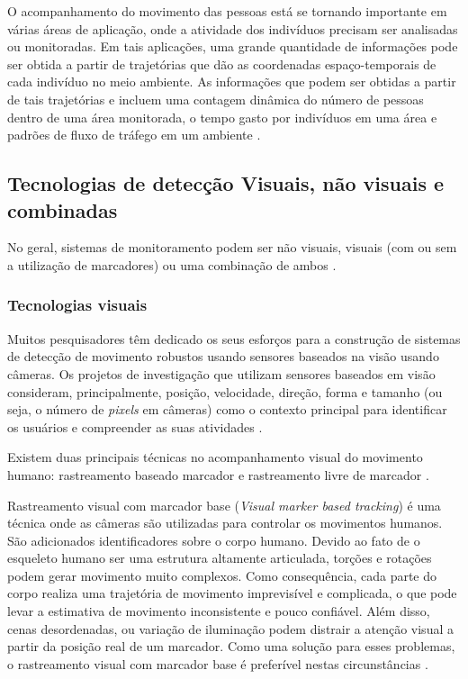 O acompanhamento do movimento das pessoas está se tornando importante em várias áreas de aplicação, onde a atividade dos indivíduos precisam ser analisadas ou monitoradas. Em tais aplicações, uma grande quantidade de informações pode ser obtida a partir de trajetórias que dão as coordenadas espaço-temporais de cada indivíduo no meio ambiente. As informações que podem ser obtidas a partir de tais trajetórias e incluem uma contagem dinâmica do número de pessoas dentro de uma área monitorada, o tempo gasto por indivíduos em uma área e padrões de fluxo de tráfego em um ambiente \cite{segen1996camera}. 

\subsection{Tecnologias de detecção Visuais, não visuais e combinadas}\label{sec:tec-rastreamento}
No geral, sistemas de monitoramento podem ser não visuais, visuais (com ou sem a utilização de marcadores) ou uma combinação de ambos \cite{zhou2008human}.

\subsubsection{Tecnologias visuais}\label{sec:sens-genericos}
Muitos pesquisadores têm dedicado os seus esforços para a construção de sistemas de detecção de movimento robustos usando sensores baseados na visão usando câmeras. Os projetos de investigação que utilizam sensores baseados em visão consideram, principalmente, posição, velocidade, direção, forma e tamanho (ou seja, o número de \textit{pixels} em câmeras) como o contexto principal para identificar os usuários e compreender as suas atividades \cite{stauffer200l}.

Existem duas principais técnicas no acompanhamento visual do movimento humano: rastreamento baseado marcador e rastreamento livre de marcador \cite{YTao2010}.

Rastreamento visual com marcador base (\textit{Visual marker based tracking}) é uma técnica onde as câmeras são utilizadas para controlar os movimentos humanos. São adicionados identificadores sobre o corpo humano. Devido ao fato de o esqueleto humano ser uma estrutura altamente articulada, torções e rotações podem gerar movimento muito complexos. Como consequência, cada parte do corpo realiza uma trajetória de movimento imprevisível e complicada, o que pode levar a estimativa de movimento inconsistente e pouco confiável. Além disso, cenas desordenadas, ou variação de iluminação podem distrair a atenção visual a partir da posição real de um marcador. Como uma solução para esses problemas, o rastreamento visual com marcador base é preferível nestas circunstâncias \cite{zhang2002visual}.

